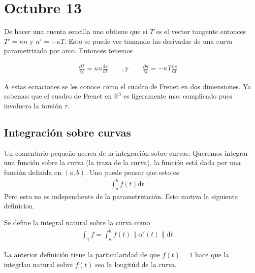 \documentclass{article}
\theoremstyle{mytheoremstyle}
\theoremstyle{mytheoremstyle}
\theoremstyle{myproblemstyle}
\begin{document}
    \section{Octubre 13}

    De hacer una cuenta sencilla uno obtiene que si $T$ es el vector tangente entonces $T'=\kappa n $ y $n'=-\kappa T$. Esto se puede ver tomando las derivadas de una curva parametrizada por arco. Entonces tenemos 

    \begin{align}
      \frac{\partial T}{\partial t }= \kappa n \frac{\mathrm d s}{\mathrm d t} \qquad,\text{y}\qquad \frac{\partial n}{\partial t} = -\kappa T \frac{\mathrm d s }{\mathrm d t}
    \end{align}

    A estas ecuaciones se les conoce como el cuadro de Frenet en dos dimensiones. Ya sabemos que el cuadro de Frenet en $\mathbb{R}^3$ es ligeramente mas complicado pues involucra la torsión $\tau$.

    \subsection{Integración sobre curvas}
    Un comentario pequeño acerca de la integración sobre curvas: Queremos integrar una función sobre la curva (la traza de la curva), la función está dada por una función definida en $(a,b)$. Uno puede pensar que esto es
    \begin{align}
      \int_{a}^{b} f(t) \mathrm{d} t.
    \end{align}
Pero esto no es independiente de la parametrización. Esto motiva la siguiente definicion.
\begin{definition}
  Se define la integral natural sobre la curva como 
  \begin{align}
  \int_\gamma f = \int_{a}^{b} f(t) \|\alpha'(t)\|\mathrm{d} t .
  \end{align}
\end{definition}
La anterior definición tiene la particularidad de que $f(t)=1$ hace que la integrlan natural sobre $f(t)$ sea la longitúd de la curva. 
\end{document}
